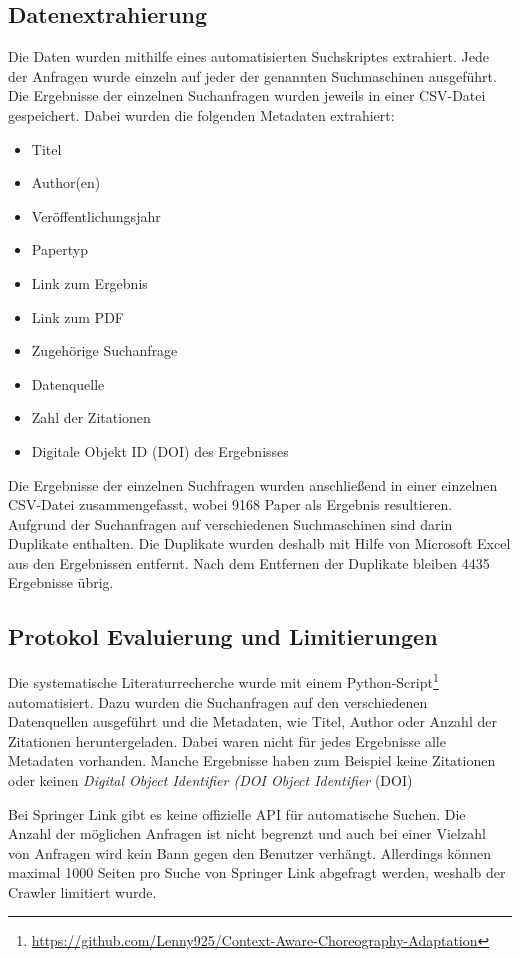 \documentclass[conference,compsoc]{IEEEtran}
\begin{document}
\subsection{Datenextrahierung}
Die Daten wurden mithilfe eines automatisierten Suchskriptes extrahiert.
Jede der Anfragen wurde einzeln auf jeder der genannten Suchmaschinen ausgeführt. Die Ergebnisse der einzelnen Suchanfragen wurden jeweils in einer CSV-Datei gespeichert.
Dabei wurden die folgenden Metadaten extrahiert:

\begin{itemize}
	\item Titel
	\item Author(en)
	\item Veröffentlichungsjahr
	\item Papertyp
	\item Link zum Ergebnis
	\item Link zum PDF
	\item Zugehörige Suchanfrage
	\item Datenquelle
	\item Zahl der Zitationen
	\item Digitale Objekt ID (DOI) des Ergebnisses
\end{itemize}

Die Ergebnisse der einzelnen Suchfragen wurden anschließend in einer einzelnen CSV-Datei zusammengefasst, wobei 9168 Paper als Ergebnis resultieren. Aufgrund der Suchanfragen auf verschiedenen Suchmaschinen sind darin Duplikate enthalten. Die Duplikate wurden deshalb mit Hilfe von Microsoft Excel aus den Ergebnissen entfernt.
Nach dem Entfernen der Duplikate bleiben 4435 Ergebnisse übrig.

\subsection{Protokol Evaluierung und Limitierungen}
Die systematische Literaturrecherche wurde mit einem Python-Script\footnote{\url{https://github.com/Lenny925/Context-Aware-Choreography-Adaptation}} automatisiert. Dazu wurden die Suchanfragen auf den verschiedenen Datenquellen ausgeführt und die Metadaten, wie Titel, Author oder Anzahl der Zitationen heruntergeladen. Dabei waren nicht für jedes Ergebnisse alle Metadaten vorhanden. Manche Ergebnisse haben zum Beispiel keine Zitationen oder keinen \textit{Digital Object Identifier (DOI Object Identifier} (DOI)

Bei Springer Link gibt es keine offizielle API für automatische Suchen. Die Anzahl der möglichen Anfragen ist nicht begrenzt und auch bei einer Vielzahl von Anfragen wird kein Bann gegen den Benutzer verhängt. Allerdings können maximal 1000 Seiten pro Suche von Springer Link abgefragt werden, weshalb der Crawler limitiert wurde. 
\end{document}
